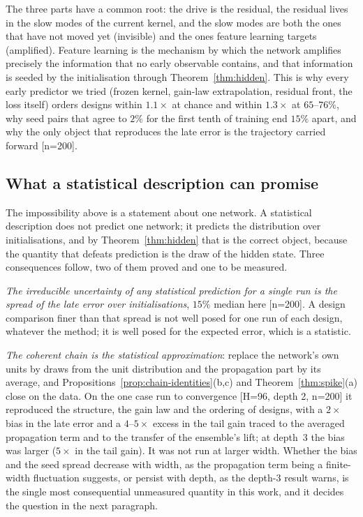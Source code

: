 The three parts have a common root: the drive is the residual, the residual
lives in the slow modes of the current kernel, and the slow modes are both the
ones that have not moved yet (invisible) and the ones feature learning
targets (amplified). Feature learning is the mechanism by which the network
amplifies precisely the information that no early observable contains, and
that information is seeded by the initialisation through
Theorem~\ref{thm:hidden}. This is why every early predictor we tried (frozen
kernel, gain-law extrapolation, residual front, the loss itself) orders
designs within $1.1\times$ at chance and within $1.3\times$ at $65$--$76\%$, why
seed pairs that agree to $2\%$ for the first tenth of training end $15\%$
apart, and why the only object that reproduces the late error is the
trajectory carried forward [n=200].

\subsection{What a statistical description can promise}
\label{ssec:chain-statistical}

The impossibility above is a statement about one network. A statistical
description does not predict one network; it predicts the distribution over
initialisations, and by Theorem~\ref{thm:hidden} that is the correct object,
because the quantity that defeats prediction is the draw of the hidden state.
Three consequences follow, two of them proved and one to be measured.

\emph{The irreducible uncertainty of any statistical prediction for a single
run is the spread of the late error over initialisations}, $15\%$ median here
[n=200]. A design comparison finer than that spread is not well posed for one
run of each design, whatever the method; it is well posed for the expected
error, which is a statistic.

\emph{The coherent chain is the statistical approximation}: replace the
network's own units by draws from the unit distribution and the propagation
part by its average, and Propositions~\ref{prop:chain-identities}(b,c) and
Theorem~\ref{thm:spike}(a) close on the data. On the one case run to
convergence [H=96, depth 2, n=200] it reproduced the structure, the gain law
and the ordering of designs, with a $2\times$ bias in the late error and a
$4$--$5\times$ excess in the tail gain traced to the averaged propagation term and
to the transfer of the ensemble's lift; at depth~3 the bias was larger
($5\times$ in the tail gain). It was not run at larger width. Whether the
bias and the seed spread decrease with width, as the propagation term being
a finite-width fluctuation suggests, or persist with depth, as the depth-3
result warns, is the single most consequential unmeasured quantity in this
work, and it decides the question in the next paragraph.

